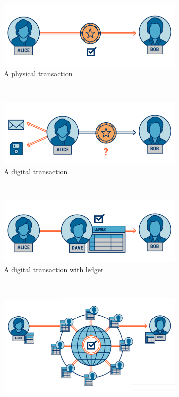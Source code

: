 \begin{figure}[h!]
    \centering
    \begin{subfigure}[b]{0.5\textwidth}
        \includegraphics[width=\textwidth]{Figures/blockchain1.png}
        \caption{A physical transaction}
        \label{fig:bc1}
    \end{subfigure}
    ~
    \begin{subfigure}[b]{0.5\textwidth}
        \includegraphics[width=\textwidth]{Figures/blockchain2.png}
        \caption{A digital transaction}
        \label{fig:bc2}
    \end{subfigure}
    ~
    \begin{subfigure}[b]{0.5\textwidth}
        \includegraphics[width=\textwidth]{Figures/blockchain3.png}
        \caption{A digital transaction with ledger}
        \label{fig:bc3}
    \end{subfigure}
    ~
    \begin{subfigure}[b]{0.7\textwidth}
        \includegraphics[width=\textwidth]{Figures/blockchain4.png}

\end{subfigure}
\end{figure}
